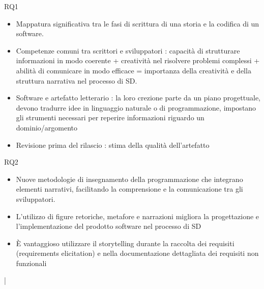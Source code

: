 \documentclass{beamer}
\begin{document}
\begin{frame}[t]{\centerline{RQ1}}
  \begin{itemize}
      \item Mappatura significativa tra le fasi di scrittura di una storia e la codifica di un software. 
      \item Competenze comuni tra scrittori e sviluppatori : capacità di strutturare informazioni in modo coerente + creatività nel risolvere problemi complessi + abilità di comunicare in modo efficace = importanza della creatività e della struttura narrativa nel processo di SD. 
      \item Software e artefatto letterario : la loro crezione parte da un piano progettuale, devono tradurre idee in linguaggio naturale o di programmazione, impostano gli strumenti necessari per reperire informazioni riguardo un dominio/argomento
      \item Revisione prima del rilascio : stima della qualità dell'artefatto
  \end{itemize}
  \vspace{0.5cm}
  \centering
\citet{hermans2017programming}
\end{frame}


\begin{frame}[t]{\centerline{RQ2}}
  \begin{itemize}
\item Nuove metodologie di insegnamento della programmazione che integrano elementi narrativi, facilitando la comprensione e la comunicazione tra gli sviluppatori. 
\item L'utilizzo di figure retoriche, metafore e narrazioni migliora la progettazione e l'implementazione del prodotto software nel processo di SD
\item È vantaggioso utilizzare il storytelling durante la raccolta dei requisiti (requirements elicitation) e nella documentazione dettagliata dei requisiti non funzionali
  \end{itemize}
  \centering
  \vspace{0.5cm}
\citet{6043945} | \citet{stse}
\end{frame}

\end{document}
